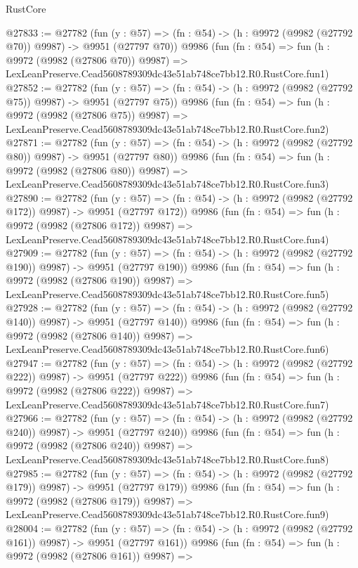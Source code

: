\begin{lexlean}{RustCore}
\begin{coremodule}
@27833 := @27782
    (fun (y : @57) => (fn : @54) -> (h : @9972 (@9982 (@27792 @70)) @9987) -> @9951 (@27797 @70))
    @9986
    (fun (fn : @54) =>
    fun (h : @9972 (@9982 (@27806 @70)) @9987) =>
    LexLeanPreserve.Cead5608789309dc43e51ab748ce7bb12.R0.RustCore.fun1)
@27852 := @27782
    (fun (y : @57) => (fn : @54) -> (h : @9972 (@9982 (@27792 @75)) @9987) -> @9951 (@27797 @75))
    @9986
    (fun (fn : @54) =>
    fun (h : @9972 (@9982 (@27806 @75)) @9987) =>
    LexLeanPreserve.Cead5608789309dc43e51ab748ce7bb12.R0.RustCore.fun2)
@27871 := @27782
    (fun (y : @57) => (fn : @54) -> (h : @9972 (@9982 (@27792 @80)) @9987) -> @9951 (@27797 @80))
    @9986
    (fun (fn : @54) =>
    fun (h : @9972 (@9982 (@27806 @80)) @9987) =>
    LexLeanPreserve.Cead5608789309dc43e51ab748ce7bb12.R0.RustCore.fun3)
@27890 := @27782
    (fun (y : @57) => (fn : @54) -> (h : @9972 (@9982 (@27792 @172)) @9987) -> @9951 (@27797 @172))
    @9986
    (fun (fn : @54) =>
    fun (h : @9972 (@9982 (@27806 @172)) @9987) =>
    LexLeanPreserve.Cead5608789309dc43e51ab748ce7bb12.R0.RustCore.fun4)
@27909 := @27782
    (fun (y : @57) => (fn : @54) -> (h : @9972 (@9982 (@27792 @190)) @9987) -> @9951 (@27797 @190))
    @9986
    (fun (fn : @54) =>
    fun (h : @9972 (@9982 (@27806 @190)) @9987) =>
    LexLeanPreserve.Cead5608789309dc43e51ab748ce7bb12.R0.RustCore.fun5)
@27928 := @27782
    (fun (y : @57) => (fn : @54) -> (h : @9972 (@9982 (@27792 @140)) @9987) -> @9951 (@27797 @140))
    @9986
    (fun (fn : @54) =>
    fun (h : @9972 (@9982 (@27806 @140)) @9987) =>
    LexLeanPreserve.Cead5608789309dc43e51ab748ce7bb12.R0.RustCore.fun6)
@27947 := @27782
    (fun (y : @57) => (fn : @54) -> (h : @9972 (@9982 (@27792 @222)) @9987) -> @9951 (@27797 @222))
    @9986
    (fun (fn : @54) =>
    fun (h : @9972 (@9982 (@27806 @222)) @9987) =>
    LexLeanPreserve.Cead5608789309dc43e51ab748ce7bb12.R0.RustCore.fun7)
@27966 := @27782
    (fun (y : @57) => (fn : @54) -> (h : @9972 (@9982 (@27792 @240)) @9987) -> @9951 (@27797 @240))
    @9986
    (fun (fn : @54) =>
    fun (h : @9972 (@9982 (@27806 @240)) @9987) =>
    LexLeanPreserve.Cead5608789309dc43e51ab748ce7bb12.R0.RustCore.fun8)
@27985 := @27782
    (fun (y : @57) => (fn : @54) -> (h : @9972 (@9982 (@27792 @179)) @9987) -> @9951 (@27797 @179))
    @9986
    (fun (fn : @54) =>
    fun (h : @9972 (@9982 (@27806 @179)) @9987) =>
    LexLeanPreserve.Cead5608789309dc43e51ab748ce7bb12.R0.RustCore.fun9)
@28004 := @27782
    (fun (y : @57) => (fn : @54) -> (h : @9972 (@9982 (@27792 @161)) @9987) -> @9951 (@27797 @161))
    @9986
    (fun (fn : @54) =>
    fun (h : @9972 (@9982 (@27806 @161)) @9987) =>

\end{coremodule}
\end{lexlean}

